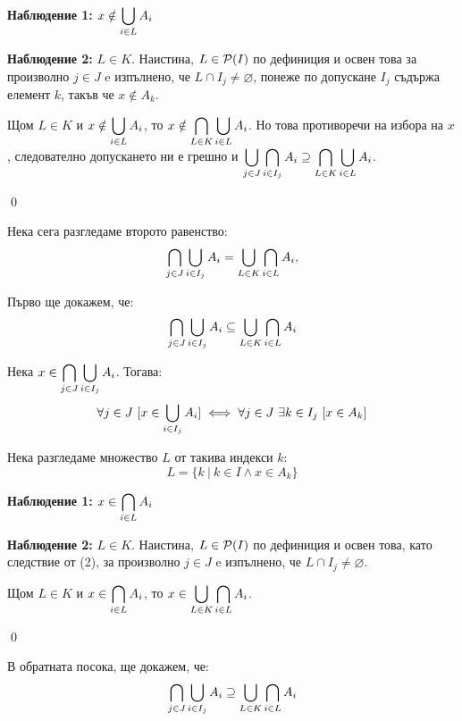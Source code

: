 \begin{problem}
\begin{tcolorbox}[mybox={Доказателство:}]
\quad
\textbf{Наблюдение 1:} $\displaystyle x \notin \bigcup_{i \in L} A_i$

\quad
\textbf{Наблюдение 2:} $L \in K$.
Наистина, $L \in \mathcal{P}(I)$ по дефиниция и освен това за произволно $j \in J$ e изпълнено, че $L \cap I_j \neq \varnothing$,
понеже по допускане $I_j$ съдържа елемент $k$, такъв че $x \notin A_k$.

\bigbreak
\quad
Щом $L \in K$ и $\displaystyle x \notin \bigcup_{i \in L} A_i$, то
$\displaystyle x \notin \bigcap_{L \in K} \bigcup_{i \in L} A_i$.
Но това противоречи на избора на $x$, следователно допускането ни е грешно и
$\displaystyle \bigcup_{j \in J} \bigcap_{i \in I_j} A_i \supseteq \bigcap_{L \in K} \bigcup_{i \in L} A_i$.

\qed
\end{tcolorbox}

\bigbreak
\quad
Нека сега разгледаме второто равенство:
\[
\bigcap_{j \in J} \bigcup_{i \in I_j} A_i = \bigcup_{L \in K} \bigcap_{i \in L} A_i,
\]

\quad
Първо ще докажем, че:
\[
\bigcap_{j \in J} \bigcup_{i \in I_j} A_i \subseteq \bigcup_{L \in K} \bigcap_{i \in L} A_i
\]

\begin{tcolorbox}[mybox={Доказателство:}]
\quad
Нека
$\displaystyle x \in \bigcap_{j \in J} \bigcup_{i \in I_j} A_i$.
Тогава:
\begin{equation}
\forall j \in J \ [x \in \bigcup_{i \in I_j} A_i] \iff
\forall j \in J \ \exists k \in I_j\ [x \in A_k]
\end{equation}

\quad
Нека разгледаме множество $L$ от такива индекси $k$:
\[
L = \{k \ |\ k \in I \land x \in A_k\}
\]

\quad
\textbf{Наблюдение 1:} $\displaystyle x \in \bigcap_{i \in L} A_i$

\quad
\textbf{Наблюдение 2:} $L \in K$.
Наистина, $L \in \mathcal{P}(I)$ по дефиниция и освен това, като следствие от (2),
за произволно $j \in J$ e изпълнено, че $L \cap I_j \neq \varnothing$.

\bigbreak
\quad
Щом $L \in K$ и $\displaystyle x \in \bigcap_{i \in L} A_i$, то
$\displaystyle x \in \bigcup_{L \in K} \bigcap_{i \in L} A_i$.

\qed
\end{tcolorbox}

\bigbreak
\quad
В обратната посока, ще докажем, че:
\[
\bigcap_{j \in J} \bigcup_{i \in I_j} A_i \supseteq \bigcup_{L \in K} \bigcap_{i \in L} A_i
\]


\end{problem}
